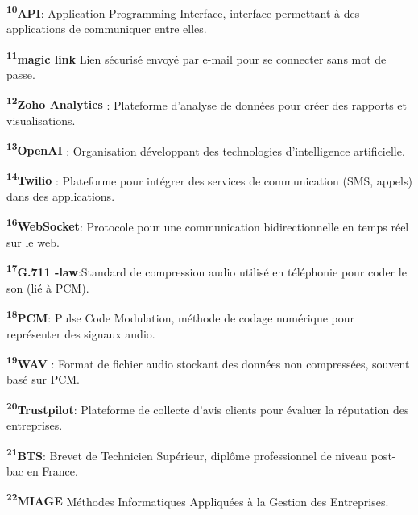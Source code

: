 \begin{small}
    \textbf{\textsuperscript{10}API}: Application Programming Interface, interface permettant à des applications de communiquer entre elles.\\\vspace{0.3cm}

    \textbf{\textsuperscript{11}magic link} Lien sécurisé envoyé par e-mail pour se connecter sans mot de passe.\\\vspace{0.3cm}

   \textbf{\textsuperscript{12}Zoho Analytics }: Plateforme d'analyse de données pour créer des rapports et visualisations.\\\vspace{0.3cm}

      \textbf{\textsuperscript{13}OpenAI }:  Organisation développant des technologies d'intelligence artificielle.\\\vspace{0.3cm}

      \textbf{\textsuperscript{14}Twilio }: Plateforme pour intégrer des services de communication (SMS, appels) dans des applications.\\\vspace{0.3cm}

     \textbf{\textsuperscript{16}WebSocket}: Protocole pour une communication bidirectionnelle en temps réel sur le web.\\\vspace{0.3cm}

     \textbf{\textsuperscript{17}G.711 \textmu-law}:Standard de compression audio utilisé en téléphonie pour coder le son (lié à PCM).\\\vspace{0.3cm}

     \textbf{\textsuperscript{18}PCM}: Pulse Code Modulation, méthode de codage numérique pour représenter des signaux audio.\\\vspace{0.3cm}

    \textbf{\textsuperscript{19}WAV} : Format de fichier audio stockant des données non compressées, souvent basé sur PCM.\\\vspace{0.3cm}

    \textbf{\textsuperscript{20}Trustpilot}: Plateforme de collecte d'avis clients pour évaluer la réputation des entreprises.\\\vspace{0.3cm}

     \textbf{\textsuperscript{21}BTS}: Brevet de Technicien Supérieur, diplôme professionnel de niveau post-bac en France. \\\vspace{0.3cm}

     \textbf{\textsuperscript{22}MIAGE} Méthodes Informatiques Appliquées à la Gestion des Entreprises. \\\vspace{0.3cm}


\end{small}
